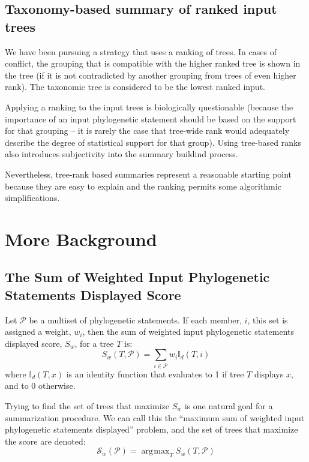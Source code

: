\documentclass[11pt]{article}
\newcommand{\ps}{phylogenetic statement\xspace}
\newcommand{\pss}{phylogenetic statements\xspace}
\newcommand{\PSs}{Phylogenetic Statements\xspace}
\newcommand{\displaysPred}[2]{\ensuremath{\mathbb{I}_d(#1, #2)}}
\DeclareMathOperator*{\argmax}{\arg\!\max}
\begin{document}
\subsection{Taxonomy-based summary of ranked input trees}
We have been pursuing a strategy that uses a ranking of trees.
In cases of conflict, the grouping that is compatible with the 
    higher ranked tree is shown in the tree (if it is not contradicted by 
    another grouping from trees of even higher rank).
 The taxonomic tree is considered to be the lowest ranked input.

Applying a ranking to the input trees is biologically questionable (because
    the importance of an input \ps should be based on the support for that
    grouping -- it is rarely the case that tree-wide rank would adequately
    describe the degree of statistical support for that group).
Using tree-based ranks also introduces subjectivity into the summary buildind process.

Nevertheless, tree-rank based summaries represent a reasonable starting point
    because they are easy to explain and the ranking permits some algorithmic
    simplifications.

\section{More Background}
\subsection{The Sum of Weighted Input \PSs Displayed Score}
Let $\mathcal{P}$ be a multiset of \pss.
If each member, $i$, this set is assigned a weight, $w_i$, then the 
sum of weighted input \pss displayed score, $S_w$, for a tree $T$ is:
\begin{equation}
    S_w(T, \mathcal{P}) = \sum_{i\in \mathcal{P}} w_i \displaysPred{T}{i}
\end{equation}
where {\displaysPred{T}{x}} is an identity function that evaluates to 1 if tree $T$
        displays $x$, and to 0 otherwise.

Trying to find the set of trees that maximize $S_w$ is one natural
    goal for a summarization procedure.
We can call this the ``maximum sum of weighted input \pss displayed'' problem,
    and the set of trees that maximize the score are denoted:
\begin{equation}
    \mathcal{S}_{w}(\mathcal{P}) = \argmax_T S_w(T,\mathcal{P}) 
\end{equation}
\end{document}
